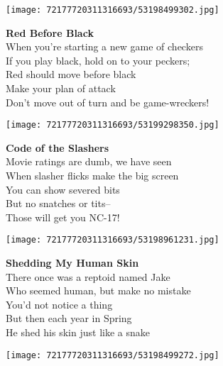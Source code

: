 \documentclass[10pt,letterpaper]{article}
\begin{document}
\begin{center}\texttt{[image: 72177720311316693/53198499302.jpg]}
\end{center}
\begin{center}
\textbf{Red Before Black}\\
\vskip 0.2in
When you're starting a new game of checkers\\
If you play black, hold on to your peckers;\\
Red should move before black\\
Make your plan of attack\\
Don't move out of turn and be game-wreckers!\\
\end{center}
\pagebreak

\begin{center}
\texttt{[image: 72177720311316693/53199298350.jpg]}
\end{center}

\begin{center}
\textbf{Code of the Slashers}\\
\vskip 0.2in
Movie ratings are dumb, we have seen\\
When slasher flicks make the big screen\\
You can show severed bits\\
But no snatches or tits--\\
Those will get you NC-17!\\
\end{center}
\pagebreak

\begin{center}\texttt{[image: 72177720311316693/53198961231.jpg]}
\end{center}
\begin{center}
\textbf{Shedding My Human Skin}\\
\vskip 0.2in
There once was a reptoid named Jake\\
Who seemed human, but make no mistake\\
You'd not notice a thing\\
But then each year in Spring\\
He shed his skin just like a snake\\
\end{center}
\pagebreak

\begin{center}
\texttt{[image: 72177720311316693/53198499272.jpg]}
\end{center}
\end{document}
